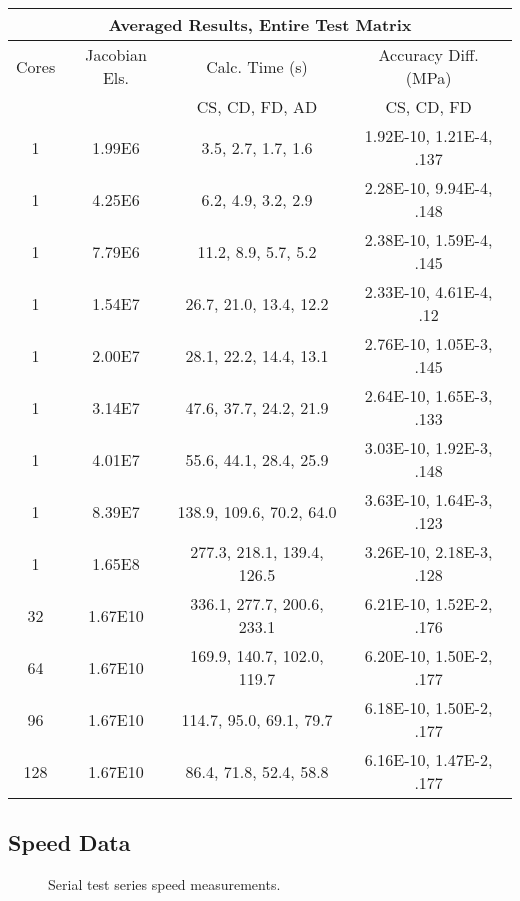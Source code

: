 \documentclass[preprint,12pt]{elsarticle}
\begin{document}
\begin{center}
    \begin{tabular}{c c c c }
    \hline
    \multicolumn{4}{c}{Averaged Results, Entire Test Matrix} \\ \hline
    Cores & Jacobian Els. & Calc. Time (s) & Accuracy Diff. (MPa)\\ 
    \multicolumn{2}{c}{} & CS, CD, FD, AD & CS, CD, FD \\ \hline 
	1 & 1.99E6  & 3.5, 2.7, 1.7, 1.6 & 1.92E-10, 1.21E-4, .137 \\ \hline
	1 & 4.25E6  & 6.2, 4.9, 3.2, 2.9 & 2.28E-10, 9.94E-4, .148 \\ \hline
	1 & 7.79E6  & 11.2, 8.9, 5.7, 5.2 & 2.38E-10, 1.59E-4, .145\\ \hline
	1 & 1.54E7  & 26.7, 21.0, 13.4, 12.2 & 2.33E-10, 4.61E-4, .12 \\ \hline
	1 & 2.00E7  & 28.1, 22.2, 14.4, 13.1 & 2.76E-10, 1.05E-3, .145 \\ \hline
	1 & 3.14E7  & 47.6, 37.7, 24.2, 21.9 & 2.64E-10, 1.65E-3, .133 \\ \hline
	1 & 4.01E7  & 55.6, 44.1, 28.4, 25.9 & 3.03E-10, 1.92E-3, .148 \\ \hline
	1 & 8.39E7  & 138.9, 109.6, 70.2, 64.0 & 3.63E-10, 1.64E-3, .123 \\ \hline
	1 & 1.65E8  & 277.3, 218.1, 139.4, 126.5 & 3.26E-10, 2.18E-3, .128 \\ \hline
	32 & 1.67E10  & 336.1, 277.7, 200.6, 233.1 & 6.21E-10, 1.52E-2, .176 \\ \hline
	64 & 1.67E10  & 169.9, 140.7, 102.0, 119.7 & 6.20E-10, 1.50E-2, .177 \\ \hline
	96 & 1.67E10  & 114.7, 95.0, 69.1, 79.7 & 6.18E-10, 1.50E-2, .177 \\ \hline
	128 & 1.67E10  & 86.4, 71.8, 52.4, 58.8 & 6.16E-10, 1.47E-2, .177 \\ \hline
    \end{tabular}
\end{center}

\subsection{Speed Data}

\begin{figure}[h]
  \centering
  \scalebox{.7}{}
  \caption{Serial test series speed measurements.}
  \label{fig:serial_speed}
\end{figure}
\end{document}
